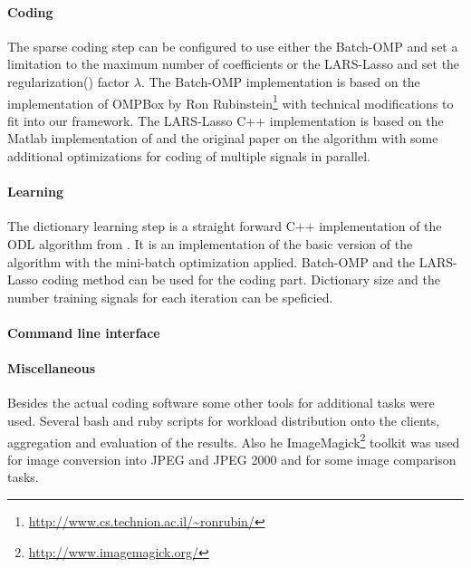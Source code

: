 
\paragraph{Coding}
The sparse coding step can be configured to use either the Batch-OMP and 
set a limitation to the maximum number of coefficients or the LARS-Lasso 
and set the regularization() factor $\lambda$.
The Batch-OMP implementation is based on the implementation
of OMPBox by Ron
 Rubinstein\footnote{\url{http://www.cs.technion.ac.il/~ronrubin/}} with
technical modifications to fit into our
framework. The LARS-Lasso C++ implementation is based on the Matlab
implementation of\cite{Strand2005} and the original
paper\cite{Efron2004} on the algorithm with some additional optimizations
for coding of multiple signals in parallel. 

\paragraph{Learning}
The dictionary learning step is a straight forward C++ implementation of the
ODL algorithm from . It is an
implementation of the
basic version of the algorithm with the mini-batch optimization applied.
Batch-OMP and the LARS-Lasso coding method can be used for the coding part.
Dictionary size and the number training signals for each iteration can be
speficied.

\paragraph{Command line interface}
%

\paragraph{Miscellaneous}
Besides the actual coding software some other tools for
additional tasks were used. Several bash and ruby scripts for workload
distribution onto the clients, aggregation and evaluation of the results.
Also he ImageMagick\footnote{\url{http://www.imagemagick.org/}} toolkit was used
for image conversion into JPEG and JPEG 2000 and for some image comparison
tasks.

